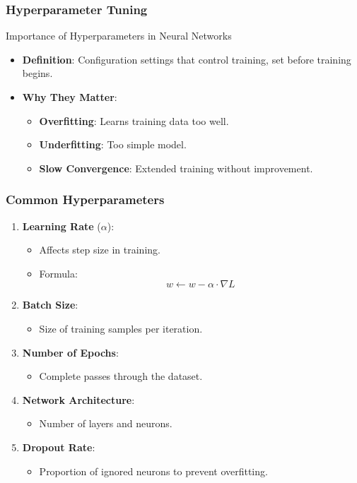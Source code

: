 \documentclass[aspectratio=169]{beamer}
\begin{document}
\begin{frame}[fragile]
    \frametitle{Hyperparameter Tuning}
    \begin{block}{Importance of Hyperparameters in Neural Networks}
        \begin{itemize}
            \item \textbf{Definition}: Configuration settings that control training, set before training begins.
            \item \textbf{Why They Matter}:
                \begin{itemize}
                    \item \textbf{Overfitting}: Learns training data too well.
                    \item \textbf{Underfitting}: Too simple model.
                    \item \textbf{Slow Convergence}: Extended training without improvement.
                \end{itemize}
        \end{itemize}
    \end{block}
\end{frame}

\begin{frame}[fragile]
    \frametitle{Common Hyperparameters}
    \begin{enumerate}
        \item \textbf{Learning Rate} ($\alpha$):
            \begin{itemize}
                \item Affects step size in training.
                \item Formula: 
                \begin{equation}
                w \leftarrow w - \alpha \cdot \nabla L
                \end{equation}
            \end{itemize}
        \item \textbf{Batch Size}: 
            \begin{itemize}
                \item Size of training samples per iteration.
            \end{itemize}
        \item \textbf{Number of Epochs}: 
            \begin{itemize}
                \item Complete passes through the dataset.
            \end{itemize}
        \item \textbf{Network Architecture}: 
            \begin{itemize}
                \item Number of layers and neurons.
            \end{itemize}
        \item \textbf{Dropout Rate}: 
            \begin{itemize}
                \item Proportion of ignored neurons to prevent overfitting.
            \end{itemize}
    \end{enumerate}
\end{frame}
\end{document}
